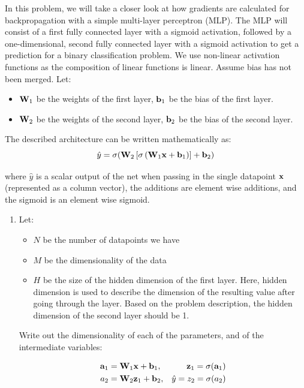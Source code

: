 \documentclass[submit]{harvardml}
\begin{document}

\begin{problem}

In this problem, we will take a closer look at how gradients are calculated for backpropagation with a simple multi-layer perceptron (MLP). The MLP will consist of a first fully connected layer with a sigmoid activation, followed by a one-dimensional, second fully connected layer with a sigmoid activation to get a prediction for a binary classification problem. We use non-linear activation functions as the composition of linear functions is linear. Assume bias has not been merged. Let:
\begin{itemize}
  \item $\bold{W}_1$ be the weights of the first layer, $\bold{b}_1$ be the bias of the first layer.
  \item $\bold{W}_2$ be the weights of the second layer, $\bold{b}_2$ be the bias of the second layer.
\end{itemize}

The described architecture can be written mathematically as: $$\hat{y} = \sigma(\bold{W}_2 \left[\sigma \left(\bold{W}_1 \bold{x} + \bold{b}_1\right)\right] + \bold{b}_2)$$

where $\hat{y}$ is a scalar output of the net when passing in the single datapoint $\bold{x}$ (represented as a column vector), the additions are element wise additions, and the sigmoid is an element wise sigmoid.

\begin{enumerate}
  \item Let:
        \begin{itemize}
          \item $N$ be the number of datapoints we have
          \item $M$ be the dimensionality of the data
          \item $H$ be the size of the hidden dimension of the first layer. Here, hidden dimension is used to describe the dimension of the resulting value after going through the layer. Based on the problem description, the hidden dimension of the second layer should be 1.
        \end{itemize}

        Write out the dimensionality of each of the parameters, and of the intermediate variables:

        \begin{align*}
          \bold{a}_1 & = \bold{W}_1 \bold{x} + \bold{b}_1,
                     & \bold{z}_1 = \sigma(\bold{a}_1)       \\
          a_2        & = \bold{W}_2 \bold{z}_1 + \bold{b}_2,
                     & \hat{y} = z_2 = \sigma(a_2)
        \end{align*}


\end{enumerate}
\end{problem}
\end{document}
